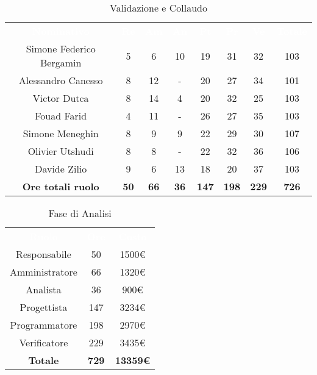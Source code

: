 \renewcommand{\arraystretch}{1.5}


\begin{table}[H]
\centering\renewcommand{\arraystretch}{1.5}
\caption{Validazione e Collaudo}
\vspace{0.2cm}
\begin{tabular}{ c | c | c | c | c | c | c | c }
\rowcolor{redafk}
\textcolor{white}{\textbf{Nominativo}} & \textcolor{white}{\textbf{Re}} & 
\textcolor{white}{\textbf{Am}} & \textcolor{white}{\textbf{An}} &
\textcolor{white}{\textbf{Pt}} & \textcolor{white}{\textbf{Pr}} &
\textcolor{white}{\textbf{Ve}} & \textcolor{white}{\textbf{Totale}} \\
Simone Federico Bergamin 	& 5 	& 6 	& 10	& 19	& 31	& 32 	& 103 \\
Alessandro Canesso 			& 8 	& 12	& - 	& 20	& 27	& 34 	& 101 \\
Victor Dutca 				& 8 	& 14	& 4 	& 20	& 32	& 25 	& 103 \\
Fouad Farid					& 4 	& 11	& - 	& 26	& 27	& 35 	& 103 \\
Simone Meneghin 			& 8 	& 9 	& 9 	& 22	& 29	& 30 	& 107 \\
Olivier Utshudi 			& 8 	& 8 	& - 	& 22	& 32	& 36 	& 106 \\
Davide Zilio 				& 9 	& 6 	& 13	& 18	& 20	& 37 	& 103 \\
\rowcolor{lastrowcolor}
\textbf{Ore totali ruolo} & \textbf{50} & \textbf{66} & \textbf{36} & \textbf{147} & \textbf{198} & \textbf{229} & \textbf{726} \\
\end{tabular}
\end{table}


\begin{table}[H]
\centering\renewcommand{\arraystretch}{1.5}
\caption{Fase di Analisi}
\vspace{0.2cm}
\begin{tabular}{ c | c | c  }
\rowcolor{redafk}
\textcolor{white}{\textbf{Ruolo}} & \textcolor{white}{\textbf{Ore}} & 
\textcolor{white}{\textbf{Costo}}  \\
Responsabile & 50 & 1500€ \\
Amministratore & 66 & 1320€ \\
Analista & 36 & 900€ \\
Progettista	& 147 & 3234€ \\
Programmatore & 198 & 2970€  \\
Verificatore & 229 & 3435€  \\
\rowcolor{lastrowcolor}
\textbf{Totale} & \textbf{729} & \textbf{13359€}  \\
\end{tabular}
\end{table}
